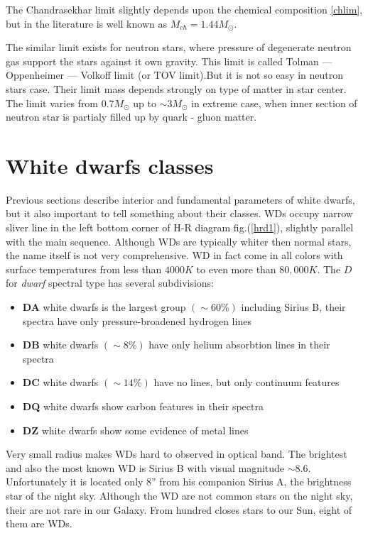 \documentclass[oneside,a4paper,11pt]{report}
\begin{document}
The Chandrasekhar limit slightly depends upon the chemical composition \eqref{chlim}, but in the literature is well known as $M_{ch} = 1.44M_\odot$.    
  
The similar limit exists for neutron stars, where pressure of degenerate neutron gas support the stars against it own gravity. 
This limit is called Tolman --- Oppenheimer --- Volkoff limit (or TOV limit).But it is not so easy in neutron stars case. Their limit 
mass depends strongly on type of matter in star center. The limit varies from $0.7 M_\odot$ up to $\sim 3M_\odot$ in extreme case, when inner section of 
neutron star is partialy filled up by quark - gluon matter.     


\section{White dwarfs classes}
Previous sections describe interior and fundamental parameters of white dwarfs, but it also important to tell something about their classes.   
WDs occupy narrow sliver line in the left bottom corner of H-R diagram fig.(\ref{hrd1}), slightly parallel with the main sequence.  
Although WDs are typically whiter then normal stars, the name itself is not very comprehensive. WD in fact come in all colors with surface 
temperatures from less than $4000K$ to even more than $80,000K$. The $D$ for \textit{dwarf} spectral type has several subdivisions:
\begin{itemize}
 \item \textbf{DA} white dwarfs is the largest group $(\sim 60\%)$ including Sirius B, their spectra have only pressure-broadened hydrogen lines 
 \item \textbf{DB} white dwarfs $(\sim 8\%)$ have only helium absorbtion lines in their spectra 
 \item \textbf{DC} white dwarfs $(\sim 14\%)$ have no lines, but only continuum features
 \item \textbf{DQ} white dwarfs show carbon features in their spectra
 \item \textbf{DZ} white dwarfs show some evidence of metal lines
\end{itemize}

Very small radius makes WDs hard to observed in optical band. The brightest and also the most known WD is Sirius B with visual magnitude $\sim8.6$. 
Unfortunately it is located only $8”$ from his companion Sirius A, the brightness star of the night sky. Although the WD are not common stars 
on the  night sky, their are not rare in our Galaxy. From hundred closes stars to our Sun, eight of them are WDs.
\end{document}
